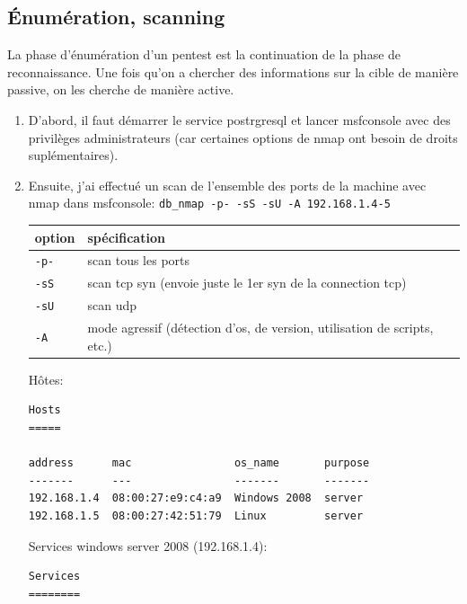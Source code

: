 \documentclass[a4paper]{article}
\begin{document}
\newpage \subsection{Énumération, scanning}





La phase d'énumération d'un pentest est la continuation de la phase de reconnaissance. Une fois qu'on a chercher des informations sur la cible de manière passive, on les cherche de manière active.

\begin{enumerate}
    \item D'abord, il faut démarrer le service postrgresql et lancer msfconsole avec des privilèges administrateurs (car certaines options de nmap ont besoin de droits suplémentaires).
    \item Ensuite, j'ai effectué un scan de l'ensemble des ports de la machine avec nmap dans msfconsole: \texttt{\footnotesize db\_nmap -p- -sS -sU -A 192.168.1.4-5}
    \begin{center} \begin{tabular}{|l|l|} \hline
        \textbf{option} & \textbf{spécification} \\ \hline \hline
        \texttt{\footnotesize -p-} & scan tous les ports \\ \hline
        \texttt{\footnotesize -sS} & scan tcp syn (envoie juste le 1er syn de la connection tcp) \\ \hline
        \texttt{\footnotesize -sU} & scan udp \\ \hline
        \texttt{\footnotesize -A}  & mode agressif (détection d’os, de version, utilisation de scripts, etc.) \\ \hline
    \end{tabular} \end{center}
    Hôtes:
    \begin{example}
\begin{Verbatim}[fontsize=\footnotesize]
Hosts
=====

address      mac                os_name       purpose
-------      ---                -------       -------
192.168.1.4  08:00:27:e9:c4:a9  Windows 2008  server
192.168.1.5  08:00:27:42:51:79  Linux         server
\end{Verbatim}
    \end{example}
    Services windows server 2008 (192.168.1.4):
    \begin{example}
\begin{Verbatim}[fontsize=\footnotesize]
Services
========


\end{Verbatim}
\end{example}
\end{enumerate}
\end{document}
